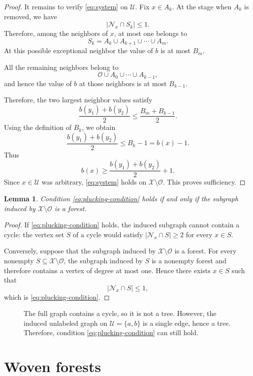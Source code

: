 \documentclass[reqno,11pt]{amsart}
\numberwithin{equation}{section}
\newtheorem{lemma}[theorem]{Lemma}
\theoremstyle{definition}
\theoremstyle{remark}
\begin{document}
\begin{proof}
It remains to verify \eqref{eq:system} on $\mathcal{U}$. Fix $x\in A_k$. At the stage when $A_k$ is removed, we have
\[
    |\mathcal{N}_x\cap S_k|\le 1.
\]
Therefore, among the neighbors of $x$, at most one belongs to
\[
    S_k=A_k\cup A_{k+1}\cup\cdots\cup A_m .
\]
At this possible exceptional neighbor
the value of $b$ is at most $B_m$.

All the remaining neighbors belong to
\[
    \mathcal{O}\cup A_0\cup\cdots\cup A_{k-1},
\]
and hence the value of $b$ at those neighbors is at most $B_{k-1}$. 

Therefore, the two largest neighbor values satisfy
\[
    \frac{b(y_1)+b(y_2)}{2}
    \le
    \frac{B_m+B_{k-1}}{2}.
\]
Using the definition of $B_k$, we obtain
\[
    \frac{b(y_1)+b(y_2)}{2}
    \le
    B_k-1
    =
    b(x)-1.
\]
Thus
\[
    b(x)\ge \frac{b(y_1)+b(y_2)}{2}+1.
\]
Since $x\in \mathcal{U}$ was arbitrary, \eqref{eq:system} holds on $\mathcal{X}\setminus\mathcal{O}$. This proves sufficiency. 
\end{proof}

\begin{lemma}\label{lem:plucking-forest}
Condition \eqref{eq:plucking-condition} holds if and only if the
subgraph induced by $\mathcal X\setminus\mathcal O$ is a forest.
\end{lemma}

\begin{proof}
If \eqref{eq:plucking-condition} holds, the induced subgraph cannot
contain a cycle: the vertex set $S$ of a cycle would satisfy
$|\mathcal N_x\cap S|\ge2$ for every $x\in S$.

Conversely, suppose that the subgraph induced by $\mathcal X\setminus\mathcal O$ is a forest. For every nonempty
$S\subseteq\mathcal X\setminus\mathcal O$, the subgraph induced by
$S$ is a nonempty forest and therefore contains a vertex of degree at
most one. Hence there exists $x\in S$ such that
\[
    |\mathcal N_x\cap S|\le1,
\]
which is \eqref{eq:plucking-condition}.
\end{proof}

\begin{figure}[ht]
\centering

\caption{The full graph contains a cycle, so it is not a tree. However, the induced unlabeled graph on $\mathcal{U}=\{a,b\}$ is a single edge, hence a tree. Therefore, condition \eqref{eq:plucking-condition} can still hold.}
\label{fig:ex-cycle-with-condition}
\end{figure}

\section{Woven forests}
\end{document}
